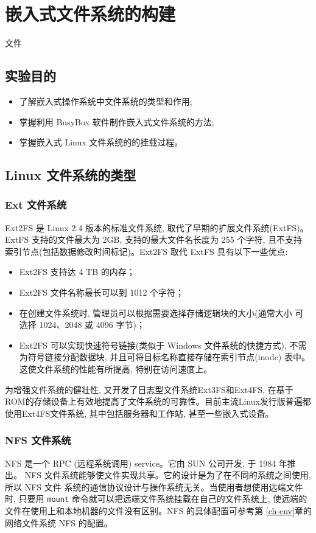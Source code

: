 \chapter{嵌入式文件系统的构建}{文件}\label{ch-fs}

\section{实验目的}
\begin{itemize}
    \item 了解嵌入式操作系统中文件系统的类型和作用;
    \item 掌握利用 BusyBox 软件制作嵌入式文件系统的方法;
    \item 掌握嵌入式 Linux 文件系统的的挂载过程。
\end{itemize}

\section{Linux 文件系统的类型}
\subsection{Ext 文件系统}
Ext2FS 是 Linux 2.4 版本的标准文件系统, 取代了早期的扩展文件系统(ExtFS)。
ExtFS 支持的文件最大为 2GB, 支持的最大文件名长度为 255 个字符, 且不支持
索引节点(包括数据修改时间标记)。Ext2FS 取代 ExtFS 具有以下一些优点:
\begin{itemize}
    \item Ext2FS 支持达 4 TB 的内存；
    \item Ext2FS 文件名称最长可以到 1012 个字符；
    \item 在创建文件系统时, 管理员可以根据需要选择存储逻辑块的大小(通常大小
        可选择 1024、2048 或 4096 字节)；
    \item Ext2FS 可以实现快速符号链接(类似于 Windows 文件系统的快捷方式),
        不需为符号链接分配数据块, 并且可将目标名称直接存储在索引节点(inode)
        表中。这使文件系统的性能有所提高, 特别在访问速度上。
\end{itemize}
为增强文件系统的健壮性, 又开发了日志型文件系统Ext3FS和Ext4FS, 在基于
ROM的存储设备上有效地提高了文件系统的可靠性。目前主流Linux发行版普遍都
使用Ext4FS文件系统, 其中包括服务器和工作站, 甚至一些嵌入式设备。

\subsection{NFS 文件系统}
NFS 是一个 RPC (远程系统调用) service。它由 SUN 公司开发, 于 1984 年推出。
NFS 文件系统能够使文件实现共享。它的设计是为了在不同的系统之间使用, 所以
NFS 文件 系统的通信协议设计与操作系统无关。当使用者想使用远端文件时,
只要用 \verb|mount| 命令就可以把远端文件系统挂载在自己的文件系统上,
使远端的文件在使用上和本地机器的文件没有区别。NFS 的具体配置可参考第
\ref{ch-env}章的网络文件系统 NFS 的配置。

